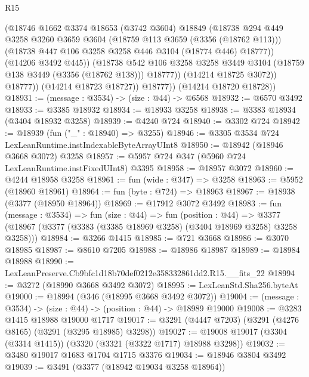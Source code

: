 \begin{lexlean}{R15}
\begin{coremodule}
                    (@18746
                      @1662
                      @3374
                      @18653
                      (@3742 @3604)
                      @18849
                      (@18738
                        @294
                        @449
                        @3258
                        @3260
                        @3659
                        @3604
                        (@18759 @113 @3659 (@3356 (@18762 @113)))
                        (@18738 @447 @106 @3258 @3258 @446 @3104 (@18774 @446) @18777))
                      (@14206 @3492 @445))
                    (@18738
                      @542
                      @106
                      @3258
                      @3258
                      @3449
                      @3104
                      (@18759 @138 @3449 (@3356 (@18762 @138)))
                      @18777))
                  (@14214 @18725 @3072))
                @18777))
            (@14214 @18723 @18727))
          @18777))
      (@14214 @18720 @18728))
@18931 := (message : @3534) -> (size : @44) -> @6568
@18932 := @6570 @3492
@18933 := @3385 @18932
@18934 := @18933 @3258
@18938 := @3383 @18934 (@3404 @18932 @3258)
@18939 := @4240 @724
@18940 := @3302 @724
@18942 := @18939 (fun ("_" : @18940) => @3255)
@18946 := @3305 @3534 @724 LexLeanRuntime.instIndexableByteArrayUInt8
@18950 := @18942 (@18946 @3668 @3072) @3258
@18957 := @5957 @724 @347 (@5960 @724 LexLeanRuntime.instFixedUInt8) @3395
@18958 := @18957 @3072
@18960 := @4244 @18958 @3258
@18961 := fun (wide : @347) => @3258
@18963 := @5952 (@18960 @18961)
@18964 := fun (byte : @724) => @18963
@18967 := @18938 (@3377 (@18950 @18964))
@18969 := @17912 @3072 @3492
@18983 := fun (message : @3534) =>
  fun (size : @44) =>
  fun (position : @44) =>
  @3377 (@18967 (@3377 (@3383 (@3385 @18969 @3258) (@3404 @18969 @3258) @3258 @3258)))
@18984 := @3266 @1415
@18985 := @721 @3668
@18986 := @3070 @18985
@18987 := @8610 @7205
@18988 := @18986 @18987
@18989 := @18984 @18988
@18990 := LexLeanPreserve.Cb9bfc1d18b70def0212e358332861dd2.R15.__fits_22
@18994 := @3272 (@18990 @3668 @3492 @3072)
@18995 := LexLeanStd.Sha256.byteAt
@19000 := @18994 (@346 (@18995 @3668 @3492 @3072))
@19004 := (message : @3534) -> (size : @44) -> (position : @44) -> @18989 @19000
@19008 := @3283 @1415 @18988 @19000 @1717
@19017 := @3291 (@4447 @7203) (@3291 (@4276 @8165) (@3291 (@3295 @18985) @3298))
@19027 := @19008 @19017 (@3304 (@3314 @1415)) (@3320 (@3321 (@3322 @1717) @18988 @3298))
@19032 := @3480 @19017 @1683 @1704 @1715 @3376
@19034 := @18946 @3804 @3492
@19039 := @3491 (@3377 (@18942 @19034 @3258 @18964))

\end{coremodule}
\end{lexlean}
